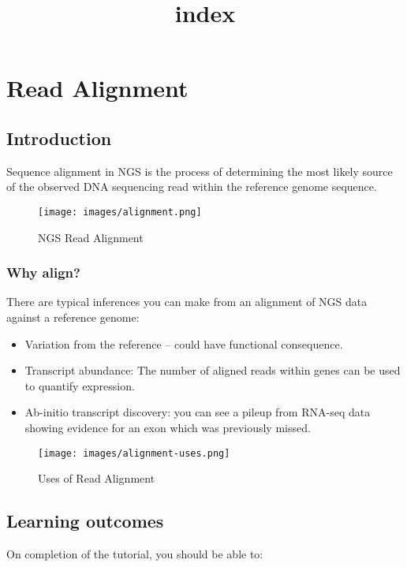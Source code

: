 \documentclass[11pt]{article}
\title{index}
\providecommand{\tightlist}{%
      \setlength{\itemsep}{0pt}\setlength{\parskip}{0pt}}
\begin{document}
    \hypertarget{read-alignment}{%
\section{Read Alignment}\label{read-alignment}}

\hypertarget{introduction}{%
\subsection{Introduction}\label{introduction}}

Sequence alignment in NGS is the process of determining the most likely
source of the observed DNA sequencing read within the reference genome
sequence.

    \begin{figure}
\centering
\texttt{[image: images/alignment.png]}
\caption{NGS Read Alignment}
\end{figure}

    \hypertarget{why-align}{%
\subsubsection{Why align?}\label{why-align}}

There are typical inferences you can make from an alignment of NGS data
against a reference genome:

\begin{itemize}
\tightlist
\item
  Variation from the reference -- could have functional consequence.
\item
  Transcript abundance: The number of aligned reads within genes can
  be used to quantify expression.
\item
  Ab-initio transcript discovery: you can see a pileup from RNA-seq data
  showing evidence for an exon which was previously missed.
\end{itemize}

    \begin{figure}
\centering
\texttt{[image: images/alignment-uses.png]}
\caption{Uses of Read Alignment}
\end{figure}

    \hypertarget{learning-outcomes}{%
\subsection{Learning outcomes}\label{learning-outcomes}}

On completion of the tutorial, you should be able to:
\end{document}

